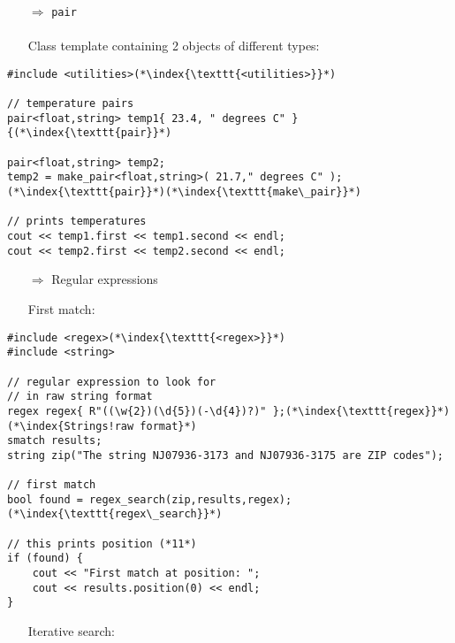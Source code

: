 \documentclass[10pt]{book}
\begin{document}
\begin{enumerate}
\item[$\Rightarrow$] \texttt{pair}\\ \\ Class template containing 2 objects of different types:
\end{enumerate}
\begin{lstlisting}
#include <utilities>(*\index{\texttt{<utilities>}}*)

// temperature pairs
pair<float,string> temp1{ 23.4, " degrees C" }{(*\index{\texttt{pair}}*)

pair<float,string> temp2; 
temp2 = make_pair<float,string>( 21.7," degrees C" );(*\index{\texttt{pair}}*)(*\index{\texttt{make\_pair}}*)

// prints temperatures
cout << temp1.first << temp1.second << endl;
cout << temp2.first << temp2.second << endl;
\end{lstlisting}
\begin{enumerate}
\item[$\Rightarrow$] Regular expressions
\end{enumerate}
\begin{enumerate}
\item[] First match:
\end{enumerate}
\begin{lstlisting}
#include <regex>(*\index{\texttt{<regex>}}*)
#include <string>

// regular expression to look for
// in raw string format 
regex regex{ R"((\w{2})(\d{5})(-\d{4})?)" };(*\index{\texttt{regex}}*)(*\index{Strings!raw format}*)
smatch results;
string zip("The string NJ07936-3173 and NJ07936-3175 are ZIP codes");

// first match
bool found = regex_search(zip,results,regex);(*\index{\texttt{regex\_search}}*)

// this prints position (*11*)
if (found) {
    cout << "First match at position: ";
    cout << results.position(0) << endl;
}
\end{lstlisting}
\begin{enumerate}
\item[] Iterative search:
\end{enumerate}
\end{document}

